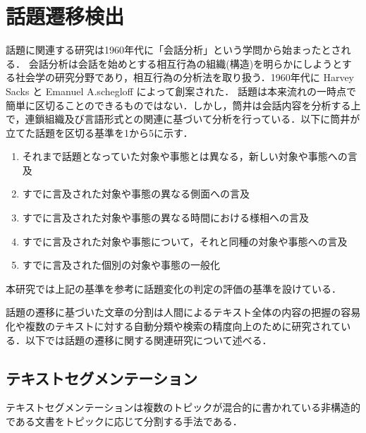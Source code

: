 \section{話題遷移検出}
\label{rel:topic}
話題に関連する研究は1960年代に「会話分析」という学問から始まったとされる．
会話分析は会話を始めとする相互行為の組織(構造)を明らかにしようとする社会学の研究分野であり，相互行為の分析法を取り扱う．1960年代に Harvey Sacks と Emanuel A.schegloff によって創案された\cite{convAnalysis}．
%
話題は本来流れの一時点で簡単に区切ることのできるものではない．しかし，筒井\cite{zatsudan}は会話内容を分析する上で，連鎖組織及び言語形式との関連に基づいて分析を行っている．以下に筒井が立てた話題を区切る基準を1から5に示す．
\begin{enumerate}
  \item それまで話題となっていた対象や事態とは異なる，新しい対象や事態への言及\label{enum:zatsudan1}
  \item すでに言及された対象や事態の異なる側面への言及
  \item すでに言及された対象や事態の異なる時間における様相への言及
  \item すでに言及された対象や事態について，それと同種の対象や事態への言及
  \item すでに言及された個別の対象や事態の一般化\label{enum:zatsudan5}
\end{enumerate}
本研究では上記の基準を参考に話題変化の判定の評価の基準を設けている．

話題の遷移に基づいた文章の分割は人間によるテキスト全体の内容の把握の容易化や複数のテキストに対する自動分類や検索の精度向上のために研究されている．以下では話題の遷移に関する関連研究について述べる．
\subsection{テキストセグメンテーション}
テキストセグメンテーションは複数のトピックが混合的に書かれている非構造的である文書をトピックに応じて分割する手法である．
